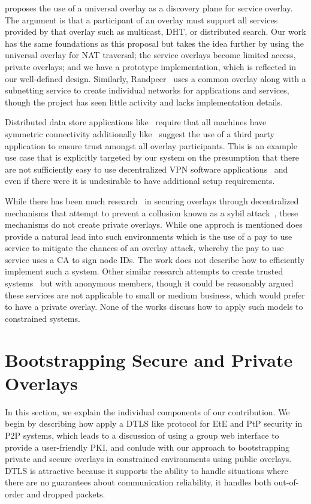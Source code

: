 \documentclass[conference]{IEEEtran}
\begin{document}
\cite{one_ring} proposes the use of a universal overlay as a discovery plane for
service overlay.  The argument is that a participant of an overlay
must support all services provided by that overlay such as multicast, DHT,
or distributed search.  Our work has the same foundations as this proposal but
takes the idea further by using the universal overlay for NAT traversal;
the service overlays become limited access, private overlays; and we have
a prototype implementation, which is reflected in our well-defined design.
Similarly, Randpeer~\cite{randpeer} uses a common overlay along with a
subnetting service to create individual networks for applications and services,
though the project has seen little activity and lacks implementation details.

Distributed data store applications like~\cite{dynamo, bigtable} require that
all machines have symmetric connectivity additionally like~\cite{past} suggest
the use of a third party application to ensure trust amongst all overlay
participants.  This is an example use case that is explicitly targeted by our
system on the presumption that there are not sufficiently easy to use
decentralized VPN software applications~\cite{sc09, nsdi10} and even if there
were it is undesirable to have additional setup requirements.

While there has been much research~\cite{secure_routing} in securing overlays
through decentralized mechanisms that attempt to prevent a collusion known as
a sybil attack~\cite{sybil}, these mechanisms do not create private overlays.
While one approch is mentioned does provide a natural lead into such
environments which is the use of a pay to use service to mitigate the chances
of an overlay attack, whereby the pay to use service uses a CA to sign node
IDs.  The work does not describe how to efficiently implement such a system.
Other similar research attempts to create trusted systems~\cite{stone, tor} but
with anonymous members, though it could be reasonably argued these services are
not applicable to small or medium business, which would prefer to have a private
overlay.  None of the works discuss how to apply such models to constrained
systems.

\section{Bootstrapping Secure and Private Overlays}
\label{contributions}
In this section, we explain the individual components of our contribution.  We
begin by describing how apply a DTLS like protocol for EtE and PtP security in
P2P systems, which leads to a discussion of using a group web interface to
provide a user-friendly PKI, and conlude with our approach to bootstrapping
private and secure overlays in constrained environments using public overlays.
DTLS is attractive because it supports the ability to handle situations where
there are no guarantees about communication reliability, it handles both
out-of-order and dropped packets.
\end{document}
